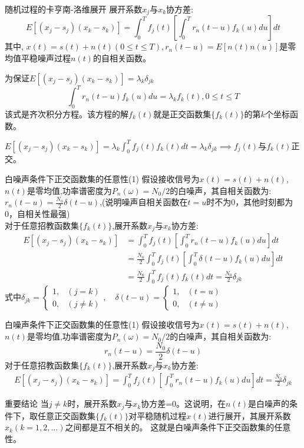 \begin{frame}{随机过程的卡亨南-洛维展开}
展开系数$x_j$与$x_k$协方差:
\[E[(x_j-s_j)(x_k-s_k)]=\int_{0}^{T}f_j(t)\left[\int_{0}^{T}r_n(t-u)f_k(u)du\right]dt \]
其中, $x(t)=s(t)+n(t)(0\le t\le T),r_n(t-u)=E[n(t)n(u)]$是零均值平稳噪声过程$n(t)$的自相关函数。

为保证$E[(x_j-s_j)(x_k-s_k)]=\lambda_k\delta_{jk}$
\[\int_{0}^{T}r_n(t-u)f_k(u)du=\lambda_kf_k(t), 0\le t\le T \]
该式是齐次积分方程。该方程的解$f_k(t)$就是正交函数集$\{f_k(t) \}$的第$k$个坐标函数。

$E[(x_j-s_j)(x_k-s_k)]=\lambda_k\int_{0}^{T}f_j(t)f_k(t)dt=\lambda_k\delta_{jk}\implies f_j(t)$与$f_k(t)$正交。
\end{frame}

\begin{frame}{白噪声条件下正交函数集的任意性(1)}
假设接收信号为$x(t)=s(t)+n(t)$, $n(t)$是零均值,功率谱密度为$P_n(\omega)=N_0/2$的白噪声，其自相关函数为: $r_n(t-u)=\frac{N_0}{2}\delta(t-u)$,(说明噪声自相关函数在$t=u$时不为0，其他时刻都为0，自相关性最强)\\
对于任意招教函数集$\{f_k(t)\}$,展开系数$x_j$与$x_k$协方差:
\begin{align*}
E[(x_j-s_j)(x_k-s_k)]&=\int_{0}^{T}f_j(t)\left[\int_{0}^{T}r_n(t-u)f_k(u)du\right]dt\\
&=\frac{N_0}{2}\int_{0}^{T}f_j(t)\left[\int_{0}^{T}\delta(t-u)f_k(u)du\right]dt\\
&=\frac{N_0}{2}\int_{0}^{T}f_j(t)f_k(t)dt=\frac{N_0}{2}\delta_{jk}
\end{align*}
式中$\delta_{jk}=
\begin{cases}
1, & (j=k)\\
0, & (j\ne k) 
\end{cases},\quad
\delta(t-u)=
\begin{cases}
	1, & (t=u)\\
	0, & (t\ne u) 
\end{cases}
$
\end{frame}

\begin{frame}{白噪声条件下正交函数集的任意性(1)}
假设接收信号为$x(t)=s(t)+n(t)$, $n(t)$是零均值,功率谱密度为$P_n(\omega)=N_0/2$的白噪声，其自相关函数为: 
\[r_n(t-u)=\frac{N_0}{2}\delta(t-u)\]
对于任意招教函数集$\{f_k(t)\}$,展开系数$x_j$与$x_k$协方差:
\begin{align*}
E[(x_j-s_j)(x_k-s_k)]=\int_{0}^{T}f_j(t)\left[\int_{0}^{T}r_n(t-u)f_k(u)du\right]dt=\frac{N_0}{2}\delta_{jk}
\end{align*}
\begin{block}{重要结论}
	当$j\ne k$时，展开系数$x_j$与$x_k$协方差=0。这说明，在$n(t)$是白噪声的条件下，取任意正交函数集$\{f_k(t)\}$对平稳随机过程$x(t)$进行展开，其展开系数$x_k(k=1,2,\dots)$之间都是互不相关的。
	这就是白噪声条件下正交函数集的任意性。
\end{block}
\end{frame}

